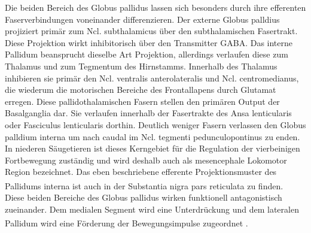 \documentclass[12pt,a4paper,pdftex]{article}
\begin{document}
Die beiden Bereich des Globus pallidus lassen sich besonders durch ihre efferenten Faserverbindungen voneinander differenzieren. Der externe Globus palldius projiziert primär zum Ncl. subthalamicus über den subthalamischen Fasertrakt. Diese Projektion wirkt inhibitorisch über den Transmitter GABA. Das interne Pallidum beansprucht dieselbe Art Projektion, allerdings verlaufen diese zum Thalamus und zum Tegmentum des Hirnstamms. Innerhalb des Thalamus inhibieren sie primär den Ncl. ventralis anterolateralis und Ncl. centromedianus, die wiederum die motorischen Bereiche des Frontallapens durch Glutamat erregen. Diese pallidothalamischen Fasern stellen den primären Output der Basalganglia dar. Sie verlaufen innerhalb der Fasertrakte des Ansa lenticularis oder Fasciculus lenticularis dorthin. Deutlich weniger Fasern verlassen den Globus palldium interna um nach caudal im Ncl. tegmenti pedunculopontinus zu enden. In niederen Säugetieren ist dieses Kerngebiet für die Regulation der vierbeinigen Fortbewegung zuständig und wird deshalb auch als mesencephale Lokomotor Region bezeichnet. Das eben beschriebene efferente Projektionsmuster des Pallidums interna ist auch in der Substantia nigra pars reticulata zu finden\textsuperscript{\cite[14]{crossman2014neuroanatomy}}.\\          
Diese beiden Bereiche des Globus pallidus wirken funktionell antagonistisch zueinander. Dem medialen Segment wird eine Unterdrückung und dem lateralen Pallidum wird eine Förderung der Bewegungsimpulse zugeordnet \textsuperscript{\cite[9]{trepel2011neuroanatomie}}.
\end{document}
